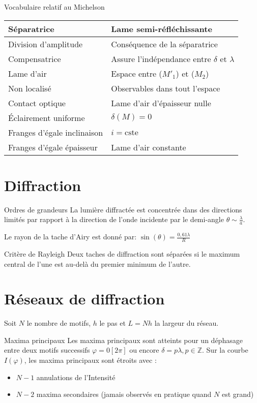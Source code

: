 \documentclass[french, a4paper, 11pt, twocolumn]{article}
\newcommand{\Z}{\mathbb{Z}}   %
\begin{document}
\begin{cadre}{Vocabulaire relatif au Michelson}
    \begin{tabularx}{\linewidth}{X|X}
      Séparatrice & Lame semi-réfléchissante \\
      \hline
      Division d'amplitude & Conséquence de la séparatrice \\
      \hline
      Compensatrice & Assure l'indépendance entre \(\delta\) et \(\lambda\) \\
      \hline
      Lame d'air & Espace entre (\(M'_1\)) et (\(M_2\)) \\
      \hline
      Non localisé & Observables dans tout l'espace \\
      \hline
      Contact optique & Lame d'air d'épaisseur nulle \\
      \hline
      Éclairement uniforme & \(\delta(M)=0\) \\
      \hline
      Franges d'égale inclinaison& \(i=\mathrm{cste}\)\\
      \hline
      Franges d'égale épaisseur & Lame d'air constante
    \end{tabularx}
\end{cadre}

\section{Diffraction}
\begin{cadre}{Ordres de grandeurs}
  La lumière diffractée est concentrée dans des directions limités par rapport à la direction de l'onde incidente par le demi-angle \(\theta\sim \frac{\lambda}{a}\).

  Le rayon de la tache d'Airy est donné par:
  \(\sin(\theta)=\frac{0,61\lambda}{R}\)
\end{cadre}

\begin{cadre}{Critère de Rayleigh}
  Deux taches de diffraction sont séparées si le maximum central de l'une est au-delà
  du premier minimum de l'autre.
\end{cadre}

\section{Réseaux de diffraction}
Soit \(N\) le nombre de motifs, \(h\) le pas et \(L=Nh\) la largeur du réseau.

\begin{cadre}{Maxima principaux}
  Les maxima principaux sont atteints pour un déphasage entre deux motifs successifs
  \(\varphi=0[2\pi]\) ou encore \(\delta=p\lambda, p \in \Z\).
  Sur la courbe \(I(\varphi)\), les maxima principaux sont étroits avec :
  \begin{itemize}
    \item \(N-1\) annulations de l'Intensité
    \item \(N-2\) maxima secondaires (jamais observés en pratique quand \(N\) est grand)
  \end{itemize}
\end{cadre}
\end{document}
